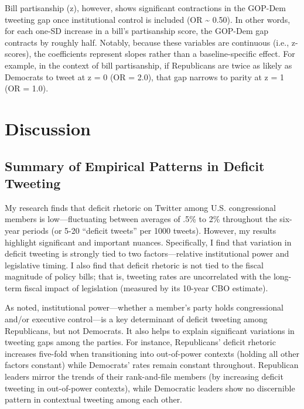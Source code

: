 \documentclass[
  12pt,
]{article}
\begin{document}
Bill partisanship (z), however, shows significant contractions in the
GOP-Dem tweeting gap once institutional control is included (OR
\textasciitilde{} 0.50). In other words, for each one-SD increase in a
bill's partisanship score, the GOP-Dem gap contracts by roughly half.
Notably, because these variables are continuous (i.e., z-scores), the
coefficients represent slopes rather than a baseline-specific effect.
For example, in the context of bill partisanship, if Republicans are
twice as likely as Democrats to tweet at z = 0 (OR = 2.0), that gap
narrows to parity at z = 1 (OR = 1.0).

\FloatBarrier

\section{Discussion}\label{discussion}

\subsection{Summary of Empirical Patterns in Deficit
Tweeting}\label{summary-of-empirical-patterns-in-deficit-tweeting}

My research finds that deficit rhetoric on Twitter among U.S.
congressional members is low---fluctuating between averages of .5\% to
2\% throughout the six-year periods (or 5-20 ``deficit tweets'' per 1000
tweets). However, my results highlight significant and important
nuances. Specifically, I find that variation in deficit tweeting is
strongly tied to two factors---relative institutional power and
legislative timing. I also find that deficit rhetoric is not tied to the
fiscal magnitude of policy bills; that is, tweeting rates are
uncorrelated with the long-term fiscal impact of legislation (measured
by its 10-year CBO estimate).

As noted, institutional power---whether a member's party holds
congressional and/or executive control---is a key determinant of deficit
tweeting among Republicans, but not Democrats. It also helps to explain
significant variations in tweeting gaps among the parties. For instance,
Republicans' deficit rhetoric increases five-fold when transitioning
into out-of-power contexts (holding all other factors constant) while
Democrats' rates remain constant throughout. Republican leaders mirror
the trends of their rank-and-file members (by increasing deficit
tweeting in out-of-power contexts), while Democratic leaders show no
discernible pattern in contextual tweeting among each other.
\end{document}
